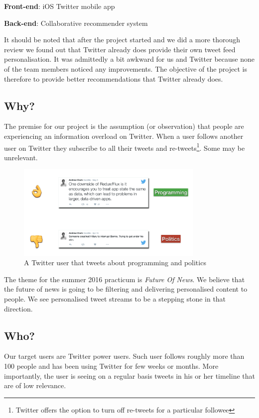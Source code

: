 \documentclass{article}
\begin{document}
\begin{itemize*}
	\item \textbf{Front-end}: iOS Twitter mobile app
	\item \textbf{Back-end}: Collaborative recommender system
\end{itemize*}

\noindent It should be noted that after the project started and we did a more thorough review we found out that Twitter already does provide their own tweet feed personalisation. It was admittedly a bit awkward for us and Twitter because none of the team members noticed any improvements. The objective of the project is therefore to provide better recommendations that Twitter already does. 

\subsection{Why?}
The premise for our project is the assumption (or observation) that people are experiencing an information overload on Twitter. When a user follows another user on Twitter they subscribe to all their tweets and re-tweets\footnote{Twitter offers the option to turn off re-tweets for a particular followee}. Some may be unrelevant.

\begin{figure}[H]
    \centering
    \includegraphics[width=0.8\textwidth]{the_problem}  
    \caption{A Twitter user that tweets about programming and politics}
\end{figure}

The theme for the summer 2016 practicum is \textit{Future Of News}. We believe that the future of news is going to be filtering and delivering personalised content to people. We see personalised tweet streams to be a stepping stone in that direction.

\subsection{Who?}
Our target users are Twitter power users. Such user follows roughly more than 100 people and has been using Twitter for few weeks or months. More importantly, the user is seeing on a regular basis tweets in his or her timeline that are of low relevance.
\end{document}
